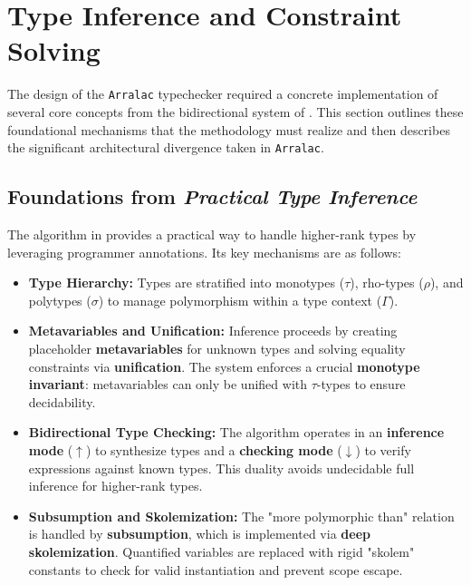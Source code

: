 \section{Type Inference and Constraint Solving}
\label{sec:Design:TypeInference}

The design of the \texttt{Arralac} typechecker required a concrete implementation of several core concepts from the bidirectional system of \cite{jones-practical-2007}. This section outlines these foundational mechanisms that the methodology must realize and then describes the significant architectural divergence taken in \texttt{Arralac}.

\subsection{Foundations from \textit{Practical Type Inference}}
\label{sec:Design:Foundations}

The algorithm in \cite{jones-practical-2007} provides a practical way to handle higher-rank types by leveraging programmer annotations. Its key mechanisms are as follows:

\begin{itemize}
    \item \textbf{Type Hierarchy:} Types are stratified into monotypes (\textbf{$\tau$}), rho-types (\textbf{$\rho$}), and polytypes (\textbf{$\sigma$}) to manage polymorphism within a type context (\textbf{$\Gamma$}).
    \item \textbf{Metavariables and Unification:} Inference proceeds by creating placeholder \textbf{metavariables} for unknown types and solving equality constraints via \textbf{unification}. The system enforces a crucial \textbf{monotype invariant}: metavariables can only be unified with $\tau$-types to ensure decidability.
    \item \textbf{Bidirectional Type Checking:} The algorithm operates in an \textbf{inference mode} ($\uparrow$) to synthesize types and a \textbf{checking mode} ($\downarrow$) to verify expressions against known types. This duality avoids undecidable full inference for higher-rank types.
    \item \textbf{Subsumption and Skolemization:} The "more polymorphic than" relation is handled by \textbf{subsumption}, which is implemented via \textbf{deep skolemization}. Quantified variables are replaced with rigid "skolem" constants to check for valid instantiation and prevent scope escape.
\end{itemize}

